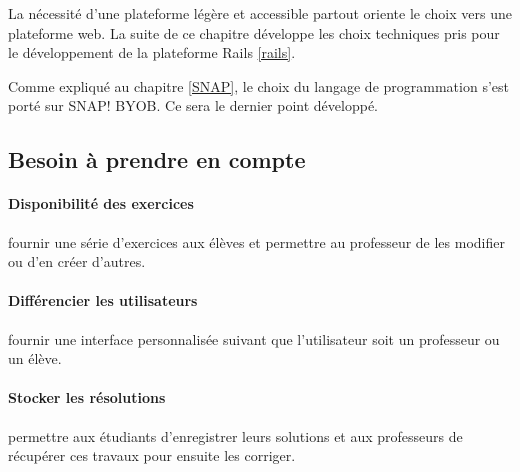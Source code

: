 La nécessité d'une plateforme légère et accessible partout oriente le choix vers une plateforme web. La suite de ce chapitre développe les choix techniques pris pour le développement de la plateforme Rails \ref{rails}. 

Comme expliqué au chapitre \ref{SNAP}, le choix du langage de programmation s'est porté sur SNAP! BYOB.  Ce sera le dernier point développé.


\subsection{Besoin à prendre en compte} %


\paragraph{Disponibilité des exercices} fournir une série d'exercices aux élèves et permettre au professeur de les modifier ou d'en créer d'autres.
\paragraph{Différencier les utilisateurs} fournir une interface personnalisée suivant que l'utilisateur soit un professeur ou un élève.
\paragraph{Stocker les résolutions} permettre aux étudiants d'enregistrer leurs solutions et aux professeurs de récupérer ces travaux pour ensuite les corriger.
